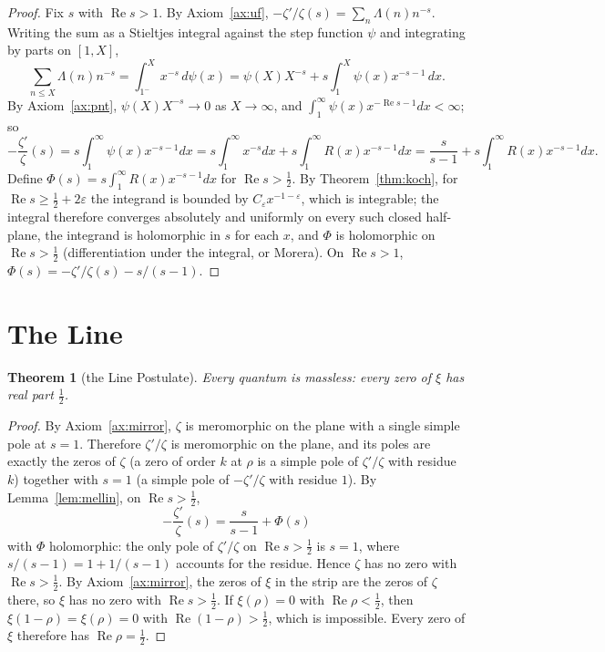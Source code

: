 \documentclass[11pt]{article}
\newtheorem{theorem}{Theorem}[section]
\theoremstyle{definition}
\theoremstyle{remark}
\newcommand{\Ree}{\operatorname{Re}}
\newcommand{\ps}{\psi}
\begin{document}
\begin{proof}
Fix $s$ with $\Ree s>1$. By Axiom~\ref{ax:uf}, $-\zeta'/\zeta(s)=\sum_n\Lambda(n)n^{-s}$. Writing the sum as a Stieltjes integral against the step function $\ps$ and integrating by parts on $[1,X]$,
\[
\sum_{n\le X}\Lambda(n)n^{-s}=\int_{1^-}^{X}x^{-s}\,d\ps(x)=\ps(X)X^{-s}+s\int_1^X\ps(x)x^{-s-1}\,dx .
\]
By Axiom~\ref{ax:pnt}, $\ps(X)X^{-s}\to0$ as $X\to\infty$, and $\int_1^\infty\ps(x)x^{-\Ree s-1}dx<\infty$; so
\[
-\frac{\zeta'}{\zeta}(s)=s\int_1^\infty\ps(x)x^{-s-1}dx=s\int_1^\infty x^{-s}dx+s\int_1^\infty R(x)x^{-s-1}dx=\frac{s}{s-1}+s\int_1^\infty R(x)x^{-s-1}dx .
\]
Define $\Phi(s)=s\int_1^\infty R(x)x^{-s-1}dx$ for $\Ree s>\tfrac12$. By Theorem~\ref{thm:koch}, for $\Ree s\ge\tfrac12+2\varepsilon$ the integrand is bounded by $C_\varepsilon x^{-1-\varepsilon}$, which is integrable; the integral therefore converges absolutely and uniformly on every such closed half-plane, the integrand is holomorphic in $s$ for each $x$, and $\Phi$ is holomorphic on $\Ree s>\tfrac12$ (differentiation under the integral, or Morera). On $\Ree s>1$, $\Phi(s)=-\zeta'/\zeta(s)-s/(s-1)$.
\end{proof}

\section{The Line}

\begin{theorem}[the Line Postulate]\label{thm:line}
Every quantum is massless: every zero of $\xi$ has real part $\tfrac12$.
\end{theorem}

\begin{proof}
By Axiom~\ref{ax:mirror}, $\zeta$ is meromorphic on the plane with a single simple pole at $s=1$. Therefore $\zeta'/\zeta$ is meromorphic on the plane, and its poles are exactly the zeros of $\zeta$ (a zero of order $k$ at $\rho$ is a simple pole of $\zeta'/\zeta$ with residue $k$) together with $s=1$ (a simple pole of $-\zeta'/\zeta$ with residue $1$). By Lemma~\ref{lem:mellin}, on $\Ree s>\tfrac12$,
\[
-\frac{\zeta'}{\zeta}(s)=\frac{s}{s-1}+\Phi(s)
\]
with $\Phi$ holomorphic: the only pole of $\zeta'/\zeta$ on $\Ree s>\tfrac12$ is $s=1$, where $s/(s-1)=1+1/(s-1)$ accounts for the residue. Hence $\zeta$ has no zero with $\Ree s>\tfrac12$. By Axiom~\ref{ax:mirror}, the zeros of $\xi$ in the strip are the zeros of $\zeta$ there, so $\xi$ has no zero with $\Ree s>\tfrac12$. If $\xi(\rho)=0$ with $\Ree\rho<\tfrac12$, then $\xi(1-\rho)=\xi(\rho)=0$ with $\Ree(1-\rho)>\tfrac12$, which is impossible. Every zero of $\xi$ therefore has $\Ree\rho=\tfrac12$.
\end{proof}
\end{document}

